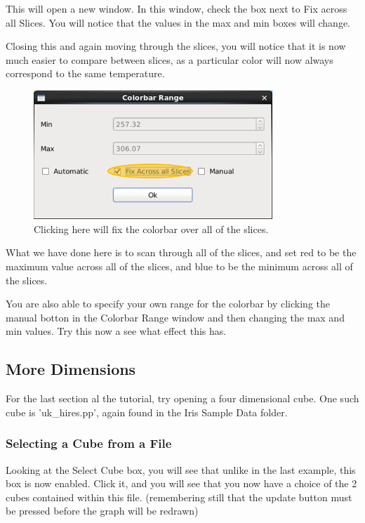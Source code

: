 \documentclass[a4paper,12pt]{article}
\begin{document}
This will open a new window. In this window, check the box next to Fix across
all Slices. You will notice that the values in the max and min boxes will change.

Closing this and again moving through the slices, you will notice that it is
now much easier to compare between slices, as a particular color will now
always correspond to the same temperature.

\begin{figure}[H]
\centering
\includegraphics[width=90mm]{resources/tute15.PNG}
\caption{Clicking here will fix the colorbar over all of the slices.}
\label{overflow}
\end{figure}

What we have done here is to scan through all of the slices, and set red to be
the maximum value across all of the slices, and blue to be the minimum across
all of the slices.

You are also able to specify your own range for the colorbar by clicking the
manual botton in the Colorbar Range window and then changing the max and min
values. Try this now a see what effect this has.

\subsection{More Dimensions}

For the last section al the tutorial, try opening a four dimensional cube. One
such cube is 'uk\_hires.pp', again found in the Iris Sample Data folder.

\subsubsection{Selecting a Cube from a File}

Looking at the Select Cube box, you will see that unlike in the last example,
this box is now enabled. Click it, and you will see that you now have a choice
of the 2 cubes contained within this file.
(remembering still that the update button must be pressed before the graph will
be redrawn)
\end{document}
